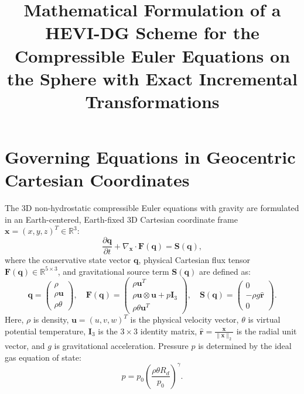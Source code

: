 \documentclass[11pt,a4paper]{article}
\title{\textbf{Mathematical Formulation of a HEVI-DG Scheme for the Compressible Euler Equations on the Sphere with Exact Incremental Transformations}}
\author{}
\date{}
\begin{document}
\maketitle

\section{Governing Equations in Geocentric Cartesian Coordinates}

The 3D non-hydrostatic compressible Euler equations with gravity are formulated in an Earth-centered, Earth-fixed 3D Cartesian coordinate frame $\boldsymbol{x} = (x, y, z)^T \in \mathbb{R}^3$:
\begin{equation}
\frac{\partial \boldsymbol{q}}{\partial t} + \nabla_{\boldsymbol{x}} \cdot \mathbf{F}(\boldsymbol{q}) = \boldsymbol{S}(\boldsymbol{q}),
\end{equation}
where the conservative state vector $\boldsymbol{q}$, physical Cartesian flux tensor $\mathbf{F}(\boldsymbol{q}) \in \mathbb{R}^{5 \times 3}$, and gravitational source term $\boldsymbol{S}(\boldsymbol{q})$ are defined as:
\begin{equation}
\boldsymbol{q} = \begin{pmatrix} \rho \\ \rho \boldsymbol{u} \\ \rho \theta \end{pmatrix}, \quad 
\mathbf{F}(\boldsymbol{q}) = \begin{pmatrix} \rho \boldsymbol{u}^T \\ \rho \boldsymbol{u} \otimes \boldsymbol{u} + p \mathbf{I}_3 \\ \rho \theta \boldsymbol{u}^T \end{pmatrix}, \quad
\boldsymbol{S}(\boldsymbol{q}) = \begin{pmatrix} 0 \\ -\rho g \hat{\boldsymbol{r}} \\ 0 \end{pmatrix}.
\end{equation}
Here, $\rho$ is density, $\boldsymbol{u} = (u, v, w)^T$ is the physical velocity vector, $\theta$ is virtual potential temperature, $\mathbf{I}_3$ is the $3 \times 3$ identity matrix, $\hat{\boldsymbol{r}} = \frac{\boldsymbol{x}}{\|\boldsymbol{x}\|_2}$ is the radial unit vector, and $g$ is gravitational acceleration. Pressure $p$ is determined by the ideal gas equation of state:
\begin{equation}
p = p_0 \left( \frac{\rho \theta R_d}{p_0} \right)^\gamma.
\end{equation}
\end{document}

